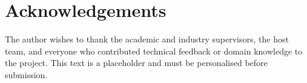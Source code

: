 \chapter*{Acknowledgements}

The author wishes to thank the academic and industry supervisors, the host team, and everyone who contributed technical feedback or domain knowledge to the project. This text is a placeholder and must be personalised before submission.

